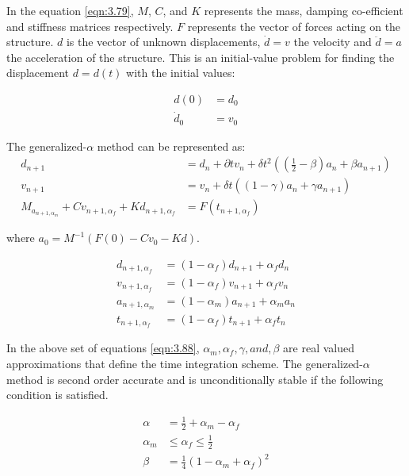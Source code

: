 In the equation \ref{eqn:3.79}, $M$, $C$, and $K$ represents the mass, damping co-efficient and stiffness matrices respectively. $F$ represents the vector of forces acting on the structure. $d$ is the vector of unknown displacements, $\dot{d} = v$ the velocity and $\ddot{d} = a$ the acceleration of the structure. This is an initial-value problem for finding the displacement $d = d(t)$ with the initial values:

\begin{align}
d(0) &= d_0\\
\dot{d}_0 &= v_0
\label{eqn:3.81}
\end{align}

The generalized-$\alpha$ method can be represented as:
\begin{align}
d_{n+1} &= d_n + \partial t v_n + \delta t^{2} \left(\left( \frac{1}{2} - \beta \right) a_n + \beta a_{n+1} \right)\\
v_{n+1} &= v_n + \delta t \left(\left( 1 - \gamma \right) a_n + \gamma a_{n+1} \right)\\
M_{a_{n+1,\alpha_m}} + C {v_{n+1,\alpha_f}} + K {d_{n+1,\alpha_f}} &= F \left( t_{n+1,\alpha_f} \right)
\label{eqn:3.84}
\end{align}

where $a_0 = M^{-1} \left(F(0) - Cv_0 - Kd \right)$. 

\begin{align}
d_{{n+1},\alpha_f} &= \left(1-{\alpha_f}\right)d_{n+1} + \alpha_f d_n\\
v_{{n+1},\alpha_f} &= \left(1-{\alpha_f}\right)v_{n+1} + \alpha_f v_n\\
a_{{n+1},\alpha_m} &= \left(1-{\alpha_m}\right)a_{n+1} + \alpha_m a_n\\
t_{{n+1},\alpha_f} &= \left(1-{\alpha_f}\right)t_{n+1} + \alpha_f t_n
\label{eqn:3.88}
\end{align}

In the above set of equations \ref{eqn:3.88}, $\alpha_m, \alpha_f, \gamma, and, \beta$ are real valued approximations that define the time integration scheme. The generalized-$\alpha$ method is second order accurate and is unconditionally stable if the following condition is satisfied.

\begin{align}
\alpha &= \frac{1}{2} + \alpha_m - \alpha_f\\
\alpha_m &\leq \alpha_f \leq \frac{1}{2}\\
\beta &= \frac{1}{4} \left(1 - \alpha_m + \alpha_f \right)^2
\label{eqn:3.91}
\end{align} 

